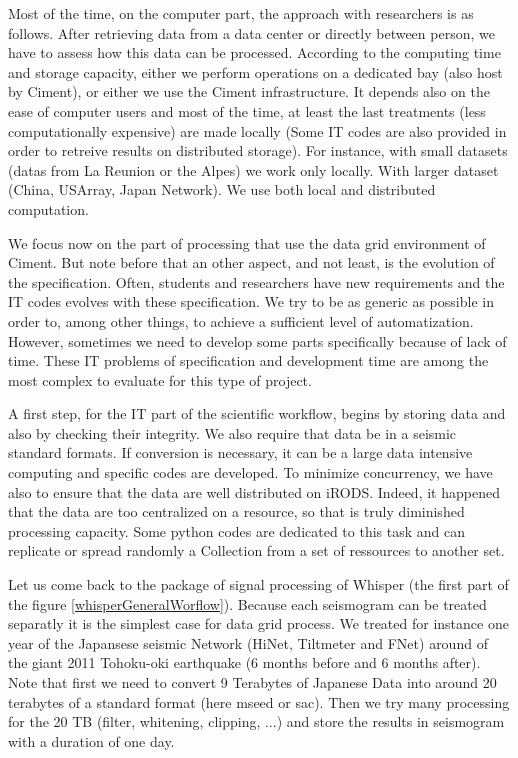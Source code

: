 \documentclass[a4paper, 10pt]{article}
\begin{document}
\begin{multicols}{2}
Most of the time, on the computer part, the approach with researchers is as follows.
After retrieving data from a data center or directly between person, we have to assess how this data can be processed.
According to the computing time and storage capacity, either we perform operations on a dedicated bay (also host by Ciment), or either we use the Ciment infrastructure.
It depends also on the ease of computer users and most of the time, at least the last treatments (less computationally expensive) are made locally
(Some IT codes are also provided in order to retreive results on distributed storage).
For instance, with small datasets (datas from La Reunion or the Alpes) we work only locally. With larger dataset (China, USArray, Japan Network).
We use both local and distributed computation.



We focus now on the part of processing that use the data grid environment of Ciment.
But note before that an other aspect, and not least, is the evolution of the specification. 
Often, students and researchers have new requirements and the IT codes evolves with these specification.
We try to be as generic as possible in order to, among other things, to achieve a sufficient level of automatization.
However, sometimes we need to develop some parts specifically because of lack of time.
These IT problems of specification and development time are among the most complex to evaluate for this type of project.


A first step, for the IT part of the scientific workflow, begins by storing data and also by checking their integrity.
We also require that data be in a seismic standard formats.
If conversion is necessary, it can be a large data intensive computing and specific codes are developed.
To minimize concurrency, we have also to ensure that the data are well distributed on iRODS. 
Indeed, it happened that the data are too centralized on a resource, so that is truly diminished processing capacity.
Some python codes are dedicated to this task and can replicate or spread randomly a Collection from a set of ressources to another set.


Let us come back to the package of signal processing of Whisper (the first part of the figure \ref{whisperGeneralWorflow}).
Because each seismogram can be treated separatly it is the simplest case for data grid process. We treated for instance one year of the
Japansese seismic Network (HiNet, Tiltmeter and FNet) around of the giant 2011 Tohoku-oki earthquake (6 months before and 6 months after).
Note that first we need to convert 9 Terabytes of Japanese Data into around 20 terabytes of a standard format (here mseed or sac).
Then we try many processing for the 20 TB (filter, whitening, clipping, ...) and store the results in seismogram with a duration of one day.



\end{multicols}
\end{document}
